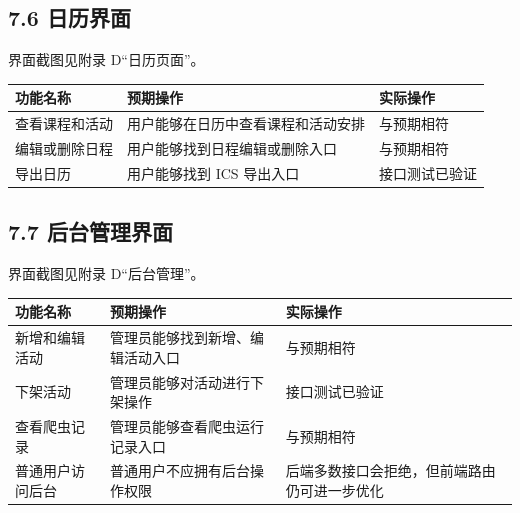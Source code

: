 \subsection{7.6 日历界面}\label{ux65e5ux5386ux754cux9762}

界面截图见附录 D``日历页面''。

{\def\LTcaptype{none} %
\begin{longtable}[]{@{}|l|l|l|@{}}
\hline
\rowcolor{gray!12}
功能名称 & 预期操作 & 实际操作 \\
\hline
\endhead
\hline
\endlastfoot
查看课程和活动 & 用户能够在日历中查看课程和活动安排 & 与预期相符 \\
\hline
编辑或删除日程 & 用户能够找到日程编辑或删除入口 & 与预期相符 \\
\hline
导出日历 & 用户能够找到 ICS 导出入口 & 接口测试已验证 \\
\hline
\end{longtable}
}

\subsection{7.7
后台管理界面}\label{ux540eux53f0ux7ba1ux7406ux754cux9762}

界面截图见附录 D``后台管理''。

{\def\LTcaptype{none} %
\begin{longtable}[]{@{}|
  >{\raggedright\arraybackslash}p{}|
  >{\raggedright\arraybackslash}p{}|
  >{\raggedright\arraybackslash}p{}|@{}}
\hline
\rowcolor{gray!12}
\begin{minipage}[b]{\linewidth}\raggedright
\bfseries 功能名称
\end{minipage} & \begin{minipage}[b]{\linewidth}\raggedright
\bfseries 预期操作
\end{minipage} & \begin{minipage}[b]{\linewidth}\raggedright
\bfseries 实际操作
\end{minipage} \\
\hline
\endhead
\hline
\endlastfoot
新增和编辑活动 & 管理员能够找到新增、编辑活动入口 & 与预期相符 \\
\hline
下架活动 & 管理员能够对活动进行下架操作 & 接口测试已验证 \\
\hline
查看爬虫记录 & 管理员能够查看爬虫运行记录入口 & 与预期相符 \\
\hline
普通用户访问后台 & 普通用户不应拥有后台操作权限 &
后端多数接口会拒绝，但前端路由仍可进一步优化 \\
\hline
\end{longtable}
}

